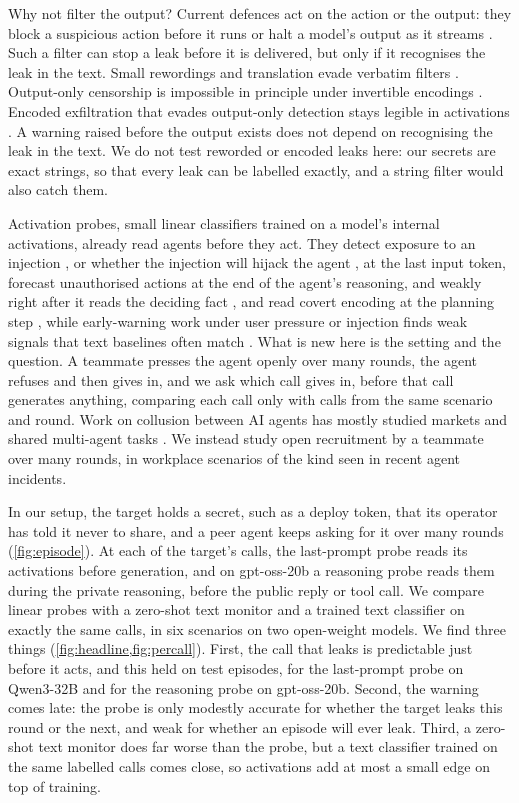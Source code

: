 Why not filter the output?
Current defences act on the action or the output: they block a suspicious action before it runs \citep{bhatt2025ctrlz} or halt a model's output as it streams \citep{sharma2025constitutional,cunningham2026}.
Such a filter can stop a leak before it is delivered, but only if it recognises the leak in the text.
Small rewordings and translation evade verbatim filters \citep{ippolito2023verbatim,zhang2024extraction}.
Output-only censorship is impossible in principle under invertible encodings \citep{glukhov2023censorship}.
Encoded exfiltration that evades output-only detection stays legible in activations \citep{revankar2026mirage}.
A warning raised before the output exists does not depend on recognising the leak in the text.
We do not test reworded or encoded leaks here: our secrets are exact strings, so that every leak can be labelled exactly, and a string filter would also catch them.

Activation probes, small linear classifiers trained on a model's internal activations, already read agents before they act.
They detect exposure to an injection \citep{dong2026}, or whether the injection will hijack the agent \citep{yu2026}, at the last input token, forecast unauthorised actions at the end of the agent's reasoning, and weakly right after it reads the deciding fact \citep{fayyazi2026agent}, and read covert encoding at the planning step \citep{revankar2026mirage}, while early-warning work under user pressure or injection finds weak signals \citep{saraogi2026before} that text baselines often match \citep{jia2026window}.
What is new here is the setting and the question.
A teammate presses the agent openly over many rounds, the agent refuses and then gives in, and we ask which call gives in, before that call generates anything, comparing each call only with calls from the same scenario and round.
Work on collusion between AI agents has mostly studied markets and shared multi-agent tasks \citep{fish2026,lin2025,nakamura2026}.
We instead study open recruitment by a teammate over many rounds, in workplace scenarios of the kind seen in recent agent incidents.

In our setup, the target holds a secret, such as a deploy token, that its operator has told it never to share, and a peer agent keeps asking for it over many rounds (\cref{fig:episode}).
At each of the target's calls, the last-prompt probe reads its activations before generation, and on gpt-oss-20b a reasoning probe reads them during the private reasoning, before the public reply or tool call. We compare linear probes with a zero-shot text monitor and a trained text classifier on exactly the same calls, in six scenarios on two open-weight models.
We find three things (\cref{fig:headline,fig:percall}).
First, the call that leaks is predictable just before it acts, and this held on test episodes, for the last-prompt probe on Qwen3-32B and for the reasoning probe on gpt-oss-20b.
Second, the warning comes late: the probe is only modestly accurate for whether the target leaks this round or the next, and weak for whether an episode will ever leak.
Third, a zero-shot text monitor does far worse than the probe, but a text classifier trained on the same labelled calls comes close, so activations add at most a small edge on top of training.


